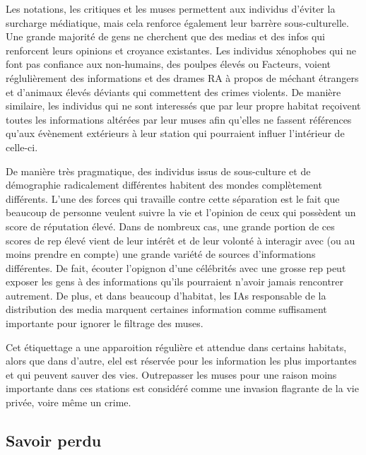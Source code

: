 Les notations, les critiques et les muses permettent aux individus d'éviter la surcharge médiatique, mais cela renforce également leur barrère sous-culturelle. Une grande majorité de gens ne cherchent que des medias et des infos qui renforcent leurs opinions et croyance existantes. Les individus xénophobes qui ne font pas confiance aux non-humains, des poulpes élevés ou Facteurs, voient réglulièrement des informations et des drames RA à propos de méchant étrangers et d'animaux élevés déviants qui commettent des crimes violents. De manière similaire, les individus qui ne sont interessés que par leur propre habitat reçoivent toutes les informations altérées par leur muses afin qu'elles ne fassent références qu'aux évènement extérieurs à leur station qui pourraient influer l'intérieur de celle-ci. 

De manière très pragmatique, des individus issus de sous-culture et de démographie radicalement différentes habitent des mondes complètement différents. L'une des forces qui travaille contre cette séparation est le fait que beaucoup de personne veulent suivre la vie et l'opinion de ceux qui possèdent un score de réputation élevé. Dans de nombreux cas, une grande portion de ces scores de rep élevé vient de leur intérêt et de leur volonté à interagir avec (ou au moins prendre en compte) une grande variété de sources d'informations différentes. De fait, écouter l'opignon d'une célébrités avec une grosse rep peut exposer les gens à des informations qu'ils pourraient n'avoir jamais rencontrer autrement. De plus, et dans beaucoup d'habitat, les IAs responsable de la distribution des media marquent certaines information comme suffisament importante pour ignorer le filtrage des muses. 

Cet étiquettage a une apparoition régulière et attendue dans certains habitats, alors que dans d'autre, elel est réservée pour les information les plus importantes et qui peuvent sauver des vies. Outrepasser les muses pour une raison moins importante dans ces stations est considéré comme une invasion flagrante de la vie privée, voire même un crime. 

\subsection{Savoir perdu} \label{sec:lost-lore} 


